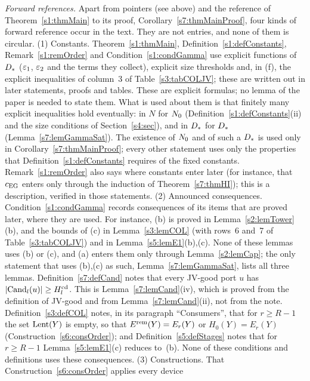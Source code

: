 \emph{Forward references.} Apart from pointers (see above) and the reference of
Theorem~\ref{s1:thmMain} to its proof, Corollary~\ref{s7:thmMainProof}, four
kinds of forward reference occur in the text. They are not entries, and none of
them is circular.
(1) Constants. Theorem~\ref{s1:thmMain}, Definition~\ref{s1:defConstants},
Remark~\ref{s1:remOrder} and Condition~\ref{s1:condGamma} use explicit
functions of $D_{*}$ ($\varepsilon_{1}$, $\varepsilon_{2}$ and the terms they collect),
explicit size thresholds and, in (f), the explicit inequalities of
column~3 of Table~\ref{s3:tabCOLJV}; these are written out in later
statements, proofs and tables.
These are explicit formulas; no lemma of the paper is needed to state them.
What is used about them is that finitely many explicit inequalities hold
eventually: in $N$ for $N_{0}$ (Definition~\ref{s1:defConstants}(ii) and the
size conditions of Section~\ref{s4:sec}), and in $D_{*}$ for $D_{*}$
(Lemma~\ref{s7:lemGammaSat}). The existence of $N_{0}$ and of such a $D_{*}$
is used only in Corollary~\ref{s7:thmMainProof}; every other statement uses only
the properties that Definition~\ref{s1:defConstants} requires of the fixed
constants. Remark~\ref{s1:remOrder} also says where
constants enter later (for instance, that $c_{\mathrm{EG}}$ enters only through the
induction of Theorem~\ref{s7:thmHI}); this is a description, verified in those
statements.
(2) Announced consequences. Condition~\ref{s1:condGamma} records consequences
of its items that are proved later, where they are used. For instance,
(b) is proved in Lemma~\ref{s2:lemTower}(b), and the bounds of (c)
in Lemma~\ref{s3:lemCOL} (with rows~6 and~7 of Table~\ref{s3:tabCOLJV}) and in
Lemma~\ref{s5:lemE1}(b),(c). None of these lemmas uses (b) or (c), and
(a) enters them only through Lemma~\ref{s2:lemCap}; the only statement
that uses (b),(c) as such, Lemma~\ref{s7:lemGammaSat}, lists all three
lemmas. Definition~\ref{s7:defCand} notes that every JV-good port $u$ has
$|\mathrm{Cand}_l(u)|\ge H^{\mathrm{cd}}_l$. This is Lemma~\ref{s7:lemCand}(iv), which is proved
from the definition of JV-good and from Lemma~\ref{s7:lemCand}(ii), not from the
note. Definition~\ref{s3:defCOL} notes, in its paragraph ``Consumers'', that
for $r\ge R-1$ the set $\mathrm{Lent}(Y)$ is empty, so that $E^{\mathrm{rem}}(Y)=E_r(Y)$ or
$H_0(Y)=E_r(Y)$ (Construction~\ref{s6:consOrder}); and
Definition~\ref{s5:defStages} notes that for $r\ge R-1$
Lemma~\ref{s5:lemE1}(c) reduces to~(b). None of these conditions and
definitions uses these consequences.
(3) Constructions. That Construction~\ref{s6:consOrder} applies every device
